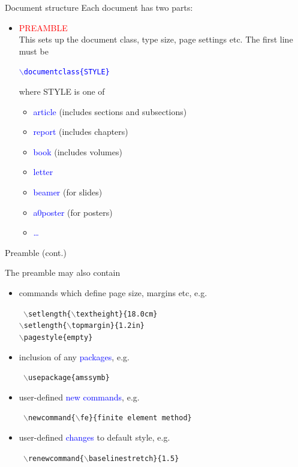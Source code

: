 \documentclass{beamer}
\def\mynormal{\vspace*{-0.5cm}}
\begin{document}
\begin{frame}{Document structure}
\mynormal
\medskip
Each document has two parts:

\begin{itemize}
\item \textcolor{red}{PREAMBLE}\\
This sets up the document class, type size, 
page settings etc. The first line must be

\begin{center}
\textcolor{blue}{\texttt{$\backslash$documentclass\{STYLE\}}}
\end{center}

where STYLE is one of
\begin{itemize}
\item \textcolor{blue}{article} (includes sections and subsections)
\item                \textcolor{blue}{report}  (includes chapters)
    \item            \textcolor{blue}{book}    (includes volumes)
        \item        \textcolor{blue}{letter}
            \item    \textcolor{blue}{beamer} (for slides)
            \item    \textcolor{blue}{a0poster} (for posters)
\item \textcolor{blue}{\ldots}
\end{itemize}
\end{itemize}
\end{frame}
\begin{frame}{Preamble (cont.)}

\mynormal
\medskip
The {preamble} may also contain 
\begin{itemize}
\item commands which define page size, margins etc,
e.g.

{\tt
$\backslash$setlength\{$\backslash$textheight\}\{18.0cm\}\\
$\backslash$setlength\{$\backslash$topmargin\}\{1.2in\}\\
$\backslash$pagestyle\{empty\}\\ }
\pause
\item inclusion of any \textcolor{blue}{packages}, e.g.

{\tt 
$\backslash$usepackage\{amssymb\}\\ }
\pause
\item user-defined \textcolor{blue}{new commands}, e.g.

{\tt 
$\backslash$newcommand\{$\backslash$fe\}\{finite element method\}\\ }
\pause
\item user-defined \textcolor{blue}{changes} to default style, e.g.

{\tt 
$\backslash$renewcommand\{$\backslash$baselinestretch\}\{1.5\}\\ }
\end{itemize}
\end{frame}
\end{document}
